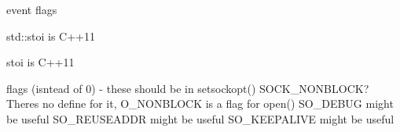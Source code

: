 
\begin{DoxyRefList}
\item[Member \mbox{\hyperlink{classHttpServer_aeb54b6186a9e7a11c6b321589f9379e1}{Http\+Server\+::start}} ()]\label{todo__todo000004}%
%
event flags  
\item[Member \mbox{\hyperlink{classParser_a32db756a819d2d0454071100f469805d}{Parser\+::retrieve\+Port}} (string)]\label{todo__todo000003}%
%
std\+::stoi is C++11  
\item[Member \mbox{\hyperlink{classTcpSocket_a7d204a80b7c5dae21ee6c930db12b29d}{Tcp\+Socket\+::bind}} (string addr, int port)]\label{todo__todo000013}%
%
stoi is C++11  
\item[Member \mbox{\hyperlink{classTcpSocket_a132aa72af141d611f8bad96ba585a79f}{Tcp\+Socket\+::Tcp\+Socket}} ()]\label{todo__todo000012}%
%
flags (isntead of 0) -\/ these should be in setsockopt() SOCK\+\_\+\+NONBLOCK? There\textquotesingle{}s no define for it, O\+\_\+\+NONBLOCK is a flag for open() SO\+\_\+\+DEBUG might be useful SO\+\_\+\+REUSEADDR might be useful SO\+\_\+\+KEEPALIVE might be useful 
\end{DoxyRefList}